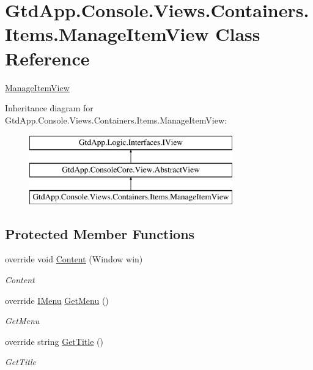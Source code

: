 \hypertarget{class_gtd_app_1_1_console_1_1_views_1_1_containers_1_1_items_1_1_manage_item_view}{}\section{Gtd\+App.\+Console.\+Views.\+Containers.\+Items.\+Manage\+Item\+View Class Reference}
\label{class_gtd_app_1_1_console_1_1_views_1_1_containers_1_1_items_1_1_manage_item_view}


\mbox{\hyperlink{class_gtd_app_1_1_console_1_1_views_1_1_containers_1_1_items_1_1_manage_item_view}{Manage\+Item\+View}}  


Inheritance diagram for Gtd\+App.\+Console.\+Views.\+Containers.\+Items.\+Manage\+Item\+View\+:\begin{figure}[H]
\begin{center}
\leavevmode
\includegraphics[height=3.000000cm]{class_gtd_app_1_1_console_1_1_views_1_1_containers_1_1_items_1_1_manage_item_view}
\end{center}
\end{figure}
\subsection*{Protected Member Functions}
\begin{DoxyCompactItemize}
\item 
override void \mbox{\hyperlink{class_gtd_app_1_1_console_1_1_views_1_1_containers_1_1_items_1_1_manage_item_view_a4b066141a958d2dc737722d5c6e2b3c6}{Content}} (Window win)
\begin{DoxyCompactList}\small\item\em Content \end{DoxyCompactList}\item 
override \mbox{\hyperlink{interface_gtd_app_1_1_console_core_1_1_menu_1_1_i_menu}{I\+Menu}} \mbox{\hyperlink{class_gtd_app_1_1_console_1_1_views_1_1_containers_1_1_items_1_1_manage_item_view_aeda5fd8190bc8ddc7c735d87c396f392}{Get\+Menu}} ()
\begin{DoxyCompactList}\small\item\em Get\+Menu \end{DoxyCompactList}\item 
override string \mbox{\hyperlink{class_gtd_app_1_1_console_1_1_views_1_1_containers_1_1_items_1_1_manage_item_view_a3e143497b8e9cb697f2863ab9d611644}{Get\+Title}} ()
\begin{DoxyCompactList}\small\item\em Get\+Title \end{DoxyCompactList}\end{DoxyCompactItemize}
